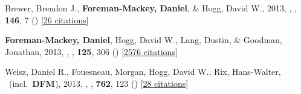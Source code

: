 \item[{\color{numcolor}\scriptsize3}] Brewer, Brendon J., \textbf{Foreman-Mackey, Daniel}, \& Hogg, David W., 2013, , \aj, \textbf{146}, 7 () [\href{http://adsabs.harvard.edu/abs/2013AJ....146....7B}{26 citations}]

\item[{\color{numcolor}\scriptsize2}] \textbf{Foreman-Mackey, Daniel}, Hogg, David W., Lang, Dustin, \& Goodman, Jonathan, 2013, , \pasp, \textbf{125}, 306 () [\href{http://adsabs.harvard.edu/abs/2013PASP..125..306F}{2576 citations}]

\item[{\color{numcolor}\scriptsize1}] Weisz, Daniel R., Fouesneau, Morgan, Hogg, David W., Rix, Hans-Walter, \etal\ (incl.\ \textbf{DFM}), 2013, , \apj, \textbf{762}, 123 () [\href{http://adsabs.harvard.edu/abs/2013ApJ...762..123W}{28 citations}]